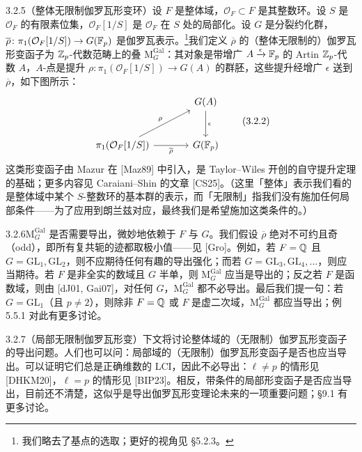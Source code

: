 \begin{exam}{3.2.5}（整体无限制伽罗瓦形变环）设 $F$ 是整体域，$\mathcal O_F\subset F$ 是其整数环。设 $S$ 是 $\mathcal O_F$ 的有限素位集，$\mathcal O_F[1/S]$ 是 $\mathcal O_F$ 在 $S$ 处的局部化。设 $G$ 是分裂约化群，$\overline\rho\colon\pi_1(\mathcal O_F[1/S])\to G(\mathbb{F}_p)$ 是伽罗瓦表示。\footnote{我们略去了基点的选取；更好的视角见 §5.2.3。}我们定义 $\overline\rho$ 的（整体无限制的）伽罗瓦形变函子为 $\mathbb{Z}_p$-代数范畴上的叠 $\mathrm{M}^{\mathrm{Gal}}_G$：其对象是带增广 $A\xrightarrow{\epsilon}\mathbb{F}_p$ 的 Artin $\mathbb{Z}_p$-代数 $A$，$A$-点是提升 $\rho\colon\pi_1(\mathcal O_F[1/S])\to G(A)$ 的群胚，这些提升经增广 $\epsilon$ 送到 $\overline\rho$，如下图所示：
\begin{equation}
\begin{tikzcd}[column sep=large, row sep=large]
& G(A) \arrow[d, "\epsilon"] \\
\pi_1(\mathcal O_F[1/S]) \arrow[ur, "\rho"] \arrow[r, "\overline\rho"'] & G(\F_p)
\end{tikzcd}
\tag{3.2.2}\label{eq:a6-02-3-2-2}
\end{equation}
这类形变函子由 Mazur 在 [Maz89] 中引入，是 Taylor–Wiles 开创的自守提升定理的基础；更多内容见 Caraiani–Shin 的文章 [CS25]。（这里「整体」表示我们看的是整体域中某个 $S$-整数环的基本群的表示，而「无限制」指我们没有施加任何局部条件——为了应用到朗兰兹对应，最终我们是希望施加这类条件的。）
\end{exam}

\begin{rem}{3.2.6}$\mathrm{M}^{\mathrm{Gal}}_G$ 是否需要导出，微妙地依赖于 $F$ 与 $G$。我们假设 $\overline\rho$ 绝对不可约且奇（odd），即所有复共轭的迹都取极小值——见 [Gro]。例如，若 $F=\mathbb{Q}$ 且 $G=\mathrm{GL}_1,\mathrm{GL}_2$，则不应期待任何有趣的导出强化；而若 $G=\mathrm{GL}_3,\mathrm{GL}_4,\dots$，则应当期待。若 $F$ 是非全实的数域且 $G$ 半单，则 $\mathrm{M}^{\mathrm{Gal}}_G$ 应当是导出的；反之若 $F$ 是函数域，则由 [dJ01, Gai07]，对任何 $G$，$\mathrm{M}^{\mathrm{Gal}}_G$ 都不必导出。最后我们提一句：若 $G=\mathrm{GL}_1$（且 $p\ne2$），则除非 $F=\mathbb{Q}$ 或 $F$ 是虚二次域，$\mathrm{M}^{\mathrm{Gal}}_G$ 都应当导出；例 5.5.1 对此有更多讨论。
\end{rem}

\begin{exam}{3.2.7}（局部无限制伽罗瓦形变）下文将讨论整体域的（无限制）伽罗瓦形变函子的导出问题。人们也可以问：局部域的（无限制）伽罗瓦形变函子是否也应当导出。可以证明它们总是正确维数的 LCI，因此不必导出：$\ell\ne p$ 的情形见 [DHKM20]，$\ell=p$ 的情形见 [BIP23]。相反，带条件的局部形变函子是否应当导出，目前还不清楚，这似乎是导出伽罗瓦形变理论未来的一项重要问题；§9.1 有更多讨论。
\end{exam}

